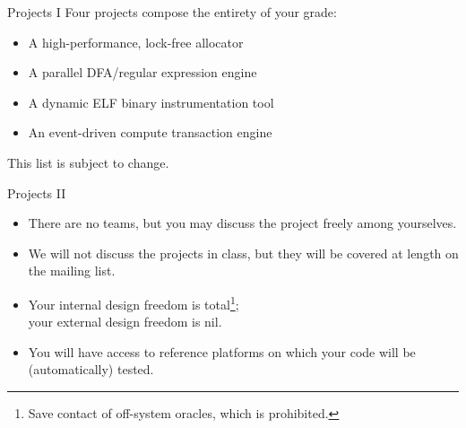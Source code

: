\documentclass{beamer}
\begin{document}
\begin{frame}[t]{Projects I}
Four projects compose the entirety of your grade:
\vspace{.25in}
\begin{itemize}
\item A high-performance, lock-free allocator
\item A parallel DFA/regular expression engine
\item A dynamic ELF binary instrumentation tool
\item An event-driven compute transaction engine
\end{itemize}
\vspace{.25in}
This list is subject to change.\\
\end{frame}

\usebackgroundtemplate{}
\begin{frame}{Projects II}
\begin{itemize}
\item There are no teams, but you may discuss the project freely among
	yourselves.
\item We will not discuss the projects in class, but they will be
	covered at length on the mailing list.
\item Your internal design freedom is total\footnote{Save contact of off-system oracles, which is prohibited.};\\
your external design freedom is nil.
\item You will have access to reference platforms on which your code will be
	(automatically) tested.
\end{itemize}
\end{frame}
\end{document}
